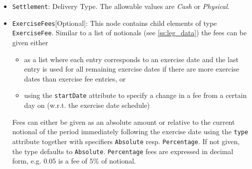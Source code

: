 \begin{itemize}
\item  \lstinline!Settlement!: Delivery Type. The allowable values are \emph{Cash} or \emph{Physical}.



\item \lstinline!ExerciseFees![Optional]: This node contains child elements of type \lstinline!ExerciseFee!. Similar to a list of notionals
  (see \ref{ss:leg_data}) the fees can be given either

  \begin{itemize}
  \item as a list where each entry corresponds to an exercise date and the last entry is used for all remaining exercise
    dates if there are more exercise dates than exercise fee entries, or
  \item using the \verb+startDate+ attribute to specify a change in a fee from a certain day on (w.r.t. the exercise
    date schedule)
  \end{itemize}

  Fees can either be given as an absolute amount or relative to the current notional of the period immediately following
  the exercise date using the \verb+type+ attribute together with specifiers \verb+Absolute+ resp. \verb+Percentage+. If
  not given, the type defaults to \verb+Absolute+. \verb+Percentage+ fees are expressed in decimal form, e.g. 0.05 is a fee of 5\% of notional.


\end{itemize}
